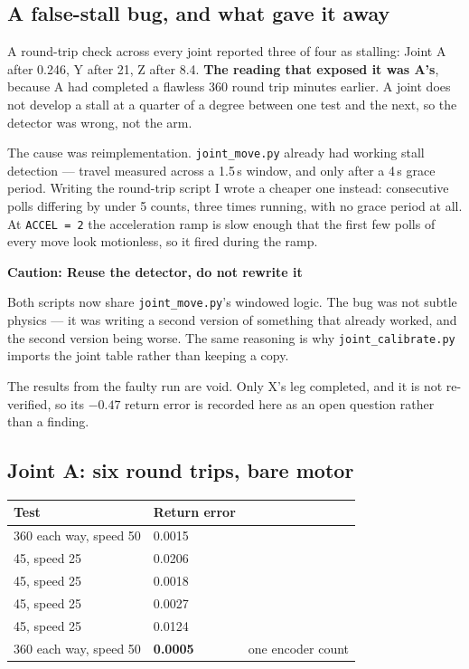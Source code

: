 \documentclass[11pt,letterpaper]{article}
\newenvironment{caution}[1]{%
    \par\addvspace{8pt}%
    \noindent{\color{cautionred}\rule{\linewidth}{0.8pt}}\par\vspace{2pt}
    \noindent\textbf{\color{cautionred}Caution: #1}\par\vspace{2pt}
}{%
    \par\vspace{2pt}\noindent{\color{cautionred}\rule{\linewidth}{0.4pt}}%
    \par\addvspace{8pt}%
}
\begin{document}
\subsection{A false-stall bug, and what gave it away}
A round-trip check across every joint reported three of four as stalling:
Joint A after 0.246\textdegree{}, Y after 21\textdegree{}, Z after 8.4\textdegree{}.
\textbf{The reading that exposed it was A's}, because A had completed a flawless
360\textdegree{} round trip minutes earlier. A joint does not develop a stall at
a quarter of a degree between one test and the next, so the detector was wrong,
not the arm.

The cause was reimplementation. \texttt{joint\_move.py} already had working stall
detection --- travel measured across a 1.5\,s window, and only after a 4\,s grace
period. Writing the round-trip script I wrote a cheaper one instead: consecutive
polls differing by under 5 counts, three times running, with no grace period at
all. At \texttt{ACCEL = 2} the acceleration ramp is slow enough that the first
few polls of every move look motionless, so it fired during the ramp.

\begin{caution}{Reuse the detector, do not rewrite it}
Both scripts now share \texttt{joint\_move.py}'s windowed logic. The bug was not
subtle physics --- it was writing a second version of something that already
worked, and the second version being worse. The same reasoning is why
\texttt{joint\_calibrate.py} imports the joint table rather than keeping a copy.
\end{caution}

The results from the faulty run are void. Only X's leg completed, and it is not
re-verified, so its $-0.47$\textdegree{} return error is recorded here as an open
question rather than a finding.

\subsection{Joint A: six round trips, bare motor}
\begin{center}
\begin{tabular}{lll}
\toprule
\textbf{Test} & \textbf{Return error} & \\ \midrule
360\textdegree{} each way, speed 50 & 0.0015\textdegree{} & \\
45\textdegree{}, speed 25 & 0.0206\textdegree{} & \\
45\textdegree{}, speed 25 & 0.0018\textdegree{} & \\
45\textdegree{}, speed 25 & 0.0027\textdegree{} & \\
45\textdegree{}, speed 25 & 0.0124\textdegree{} & \\
360\textdegree{} each way, speed 50 & \textbf{0.0005\textdegree{}} & one encoder count \\
\bottomrule
\end{tabular}
\end{center}
\end{document}
